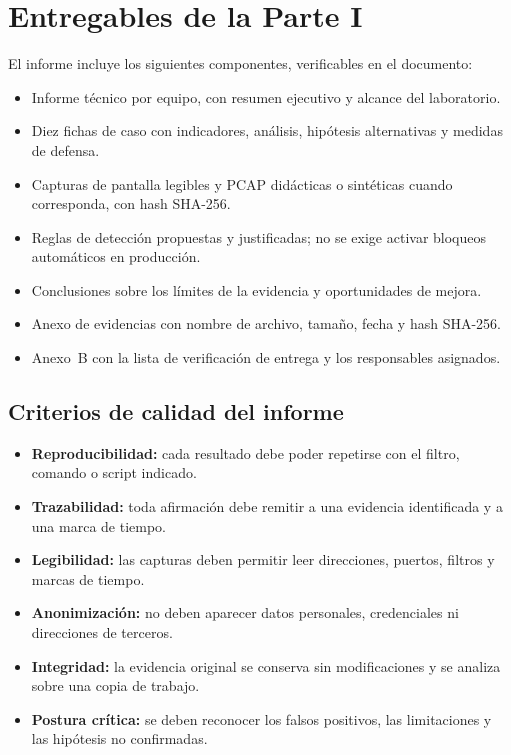 \clearpage
\section{Entregables de la Parte I}

El informe incluye los siguientes componentes, verificables en el documento:

\begin{itemize}[leftmargin=*, topsep=2pt, itemsep=4pt, label=\checkedbox]
	\item Informe técnico por equipo, con resumen ejecutivo y alcance del laboratorio.
	\item Diez fichas de caso con indicadores, análisis, hipótesis alternativas y medidas de defensa.
	\item Capturas de pantalla legibles y PCAP didácticas o sintéticas cuando corresponda, con hash SHA-256.
	\item Reglas de detección propuestas y justificadas; no se exige activar bloqueos automáticos en producción.
	\item Conclusiones sobre los límites de la evidencia y oportunidades de mejora.
	\item Anexo de evidencias con nombre de archivo, tamaño, fecha y hash SHA-256.
	\item Anexo~B con la lista de verificación de entrega y los responsables asignados.
\end{itemize}

\subsection{Criterios de calidad del informe}

\begin{itemize}[leftmargin=*, topsep=2pt, itemsep=2pt]
	\item \textbf{Reproducibilidad:} cada resultado debe poder repetirse con el filtro, comando o script indicado.
	\item \textbf{Trazabilidad:} toda afirmación debe remitir a una evidencia identificada y a una marca de tiempo.
	\item \textbf{Legibilidad:} las capturas deben permitir leer direcciones, puertos, filtros y marcas de tiempo.
	\item \textbf{Anonimización:} no deben aparecer datos personales, credenciales ni direcciones de terceros.
	\item \textbf{Integridad:} la evidencia original se conserva sin modificaciones y se analiza sobre una copia de trabajo.
	\item \textbf{Postura crítica:} se deben reconocer los falsos positivos, las limitaciones y las hipótesis no confirmadas.
\end{itemize}
